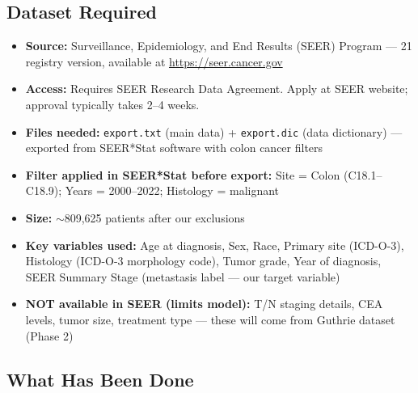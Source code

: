 \documentclass[11pt,letterpaper]{article}
\begin{document}
\subsection{Dataset Required}

\begin{tcolorbox}[colback=warnred!8, colframe=warnred,
  title=\textbf{Dataset: SEER 21 Registry (National Cancer Institute)}]
\begin{itemize}
  \item \textbf{Source:} Surveillance, Epidemiology, and End Results (SEER) Program —
        21 registry version, available at \url{https://seer.cancer.gov}
  \item \textbf{Access:} Requires SEER Research Data Agreement. Apply at SEER website;
        approval typically takes 2–4 weeks.
  \item \textbf{Files needed:}
        \texttt{export.txt} (main data) + \texttt{export.dic} (data dictionary)
        — exported from SEER*Stat software with colon cancer filters
  \item \textbf{Filter applied in SEER*Stat before export:}
        Site = Colon (C18.1–C18.9); Years = 2000–2022; Histology = malignant
  \item \textbf{Size:} $\sim$809,625 patients after our exclusions
  \item \textbf{Key variables used:} Age at diagnosis, Sex, Race, Primary site (ICD-O-3),
        Histology (ICD-O-3 morphology code), Tumor grade, Year of diagnosis,
        SEER Summary Stage (metastasis label — our target variable)
  \item \textbf{NOT available in SEER (limits model):} T/N staging details, CEA levels,
        tumor size, treatment type — these will come from Guthrie dataset (Phase 2)
\end{itemize}
\end{tcolorbox}

\subsection{What Has Been Done}
\end{document}
